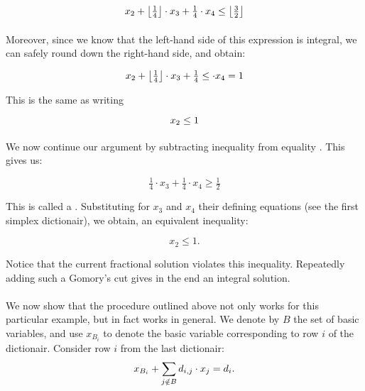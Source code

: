 {\begin{example}
\begin{equation}
x_2+\left\lfloor \tfrac{1}{4} \right\rfloor\cdot x_3+\tfrac{1}{4}\cdot x_4\leq\left\lfloor \tfrac{3}{2} \right\rfloor
\end{equation}

\paragraph{}
Moreover, since we know that the left-hand side of this expression is integral, we can safely round down the right-hand side, and obtain:

\begin{equation}
x_2+\left\lfloor \tfrac{1}{4} \right\rfloor\cdot x_3+\tfrac{1}{4}\leq\cdot x_4=1
\end{equation}

This is the same as writing

\begin{equation}
x_2\leq 1\eqnlab{cg-cut-eq2-fin}
\end{equation}

\paragraph{}
We now continue our argument by subtracting inequality  from equality . This gives us:

\begin{equation}
\tfrac{1}{4}\cdot x_3+\tfrac{1}{4}\cdot x_4\geq\tfrac{1}{2}
\end{equation}

This is called a . Substituting for $x_3$ and $x_4$ their defining equations (see the first simplex dictionair), we obtain, an equivalent inequality:

\begin{equation}
x_2\leq 1.
\end{equation}
\end{example}

\begin{note}
Notice that the current fractional solution violates this inequality. Repeatedly adding such a Gomory's cut gives in the end an integral solution.
\end{note}

\paragraph{}
We now show that the procedure outlined above not only works for this particular example, but in fact works in general. We denote by $B$ the set of basic variables, and use $x_{B_i}$ to denote the basic variable corresponding to row $i$ of the dictionair. Consider row $i$ from the last dictionair:
\begin{equation}
x_{B_i}+\sumndomain[j]{B}{d_{i,j}\cdot x_j}=d_i.\eqnlab{gc-theory1}
\end{equation}

}
